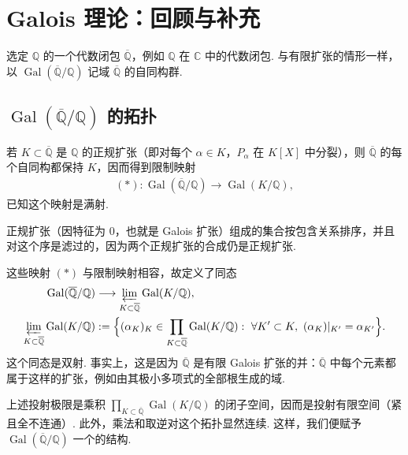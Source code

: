 \section{Galois 理论：回顾与补充}\label{sec:nt-1-1}

选定 $\mathbb{Q}$ 的一个代数闭包 $\overline{\mathbb{Q}}$，例如 $\mathbb{Q}$ 在 $\mathbb{C}$ 中的代数闭包. 与有限扩张的情形一样，以 $\operatorname{Gal}(\overline{\mathbb{Q}}/\mathbb{Q})$ 记域 $\overline{\mathbb{Q}}$ 的自同构群.

\subsection[$\operatorname{Gal}(\overline{\mathbb{Q}}/\mathbb{Q})$ 的拓扑]{$\operatorname{Gal}(\overline{\mathbb{Q}}/\mathbb{Q})$ 的拓扑\protect\footnotemark}\label{sec:nt-1-1-1}


若 $K\subset\overline{\mathbb{Q}}$ 是 $\mathbb{Q}$ 的正规扩张（即对每个 $\alpha\in K$，$P_\alpha$ 在 $K[X]$ 中分裂），则 $\overline{\mathbb{Q}}$ 的每个自同构都保持 $K$，因而得到限制映射
\begin{align*}
(*)\colon\operatorname{Gal}(\overline{\mathbb{Q}}/\mathbb{Q})\longrightarrow\operatorname{Gal}(K/\mathbb{Q}),
\end{align*}
已知这个映射是满射.

正规扩张（因特征为 $0$，也就是 Galois 扩张）组成的集合按包含关系排序，并且对这个序是滤过的，因为两个正规扩张的合成仍是正规扩张.

这些映射 $(*)$ 与限制映射相容，故定义了同态
\begin{align*}
\operatorname{Gal}(\overline{\mathbb{Q}}/\mathbb{Q})&\longrightarrow\varprojlim_{K\subset\overline{\mathbb{Q}}}\operatorname{Gal}(K/\mathbb{Q}),\\
\varprojlim_{K\subset\overline{\mathbb{Q}}}\operatorname{Gal}(K/\mathbb{Q})&:=\Bigl\{(\alpha_K)_K\in\prod_{K\subset\overline{\mathbb{Q}}}\operatorname{Gal}(K/\mathbb{Q}):\ \forall K'\subset K,\ (\alpha_K)|_{K'}=\alpha_{K'}\Bigr\}.
\end{align*}
这个同态是双射. 事实上，这是因为 $\overline{\mathbb{Q}}$ 是有限 Galois 扩张的并：$\overline{\mathbb{Q}}$ 中每个元素都属于这样的扩张，例如由其极小多项式的全部根生成的域.

上述投射极限是乘积 $\prod_{K\subset\overline{\mathbb{Q}}}\operatorname{Gal}(K/\mathbb{Q})$ 的闭子空间，因而是投射有限空间（紧且全不连通）. 此外，乘法和取逆对这个拓扑显然连续. 这样，我们便赋予 $\operatorname{Gal}(\overline{\mathbb{Q}}/\mathbb{Q})$ 一个的结构.

